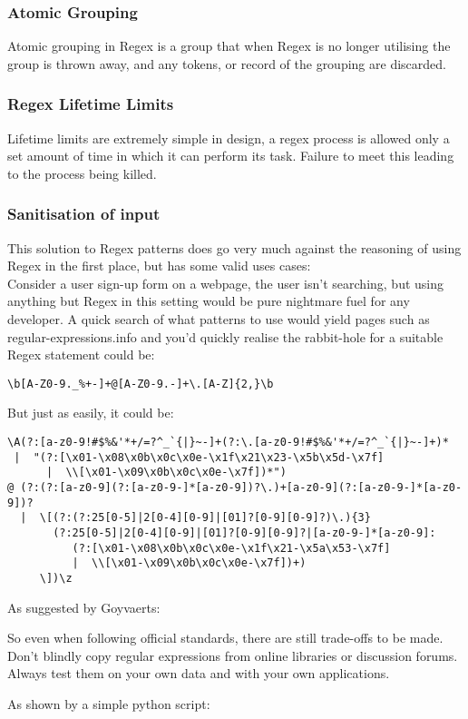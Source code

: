\documentclass[
    a4paper,
    12pt,
    headings=normal
]{article}
\begin{document}
            \subsubsection{Atomic Grouping}
                Atomic grouping in Regex is a group that when Regex is no longer utilising 
                the group is thrown away, and any tokens, or record of the grouping are discarded.
            \subsubsection{Regex Lifetime Limits}
                Lifetime limits are extremely simple in design, a regex process is allowed only 
                a set amount of time in which it can perform its task. Failure to meet this 
                leading to the process being killed.
            \subsubsection{Sanitisation of input}
                This solution to Regex patterns does go very much against the reasoning of 
                using Regex in the first place, but has some valid uses cases:\\
                Consider a user sign-up form on a webpage, the user isn't searching, but 
                using anything but Regex in this setting would be pure nightmare fuel for 
                any developer. A quick search of what patterns to use would yield pages such as
                regular-expressions.info\cite{RegularExpressions.info} and you'd quickly realise
                the rabbit-hole for a suitable Regex statement could be:
                \begin{verbatim}
\b[A-Z0-9._%+-]+@[A-Z0-9.-]+\.[A-Z]{2,}\b
                \end{verbatim}

                But just as easily, it could be: 

                \begin{verbatim}
\A(?:[a-z0-9!#$%&'*+/=?^_`{|}~-]+(?:\.[a-z0-9!#$%&'*+/=?^_`{|}~-]+)*
 |  "(?:[\x01-\x08\x0b\x0c\x0e-\x1f\x21\x23-\x5b\x5d-\x7f]
      |  \\[\x01-\x09\x0b\x0c\x0e-\x7f])*")
@ (?:(?:[a-z0-9](?:[a-z0-9-]*[a-z0-9])?\.)+[a-z0-9](?:[a-z0-9-]*[a-z0-9])?
  |  \[(?:(?:25[0-5]|2[0-4][0-9]|[01]?[0-9][0-9]?)\.){3}
       (?:25[0-5]|2[0-4][0-9]|[01]?[0-9][0-9]?|[a-z0-9-]*[a-z0-9]:
          (?:[\x01-\x08\x0b\x0c\x0e-\x1f\x21-\x5a\x53-\x7f]
          |  \\[\x01-\x09\x0b\x0c\x0e-\x7f])+)
     \])\z
                \end{verbatim}
                As suggested by Goyvaerts\cite{RegularExpressions.info}:
                \begin{displayquote}
                    So even when following official standards, there are still trade-offs to be made. Don't blindly copy regular expressions from online libraries or discussion forums. Always test them on your own data and with your own applications.
                \end{displayquote}
                As shown by a simple python script:
\end{document}
